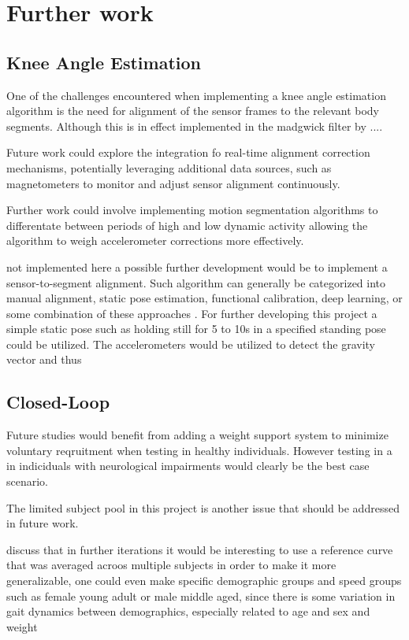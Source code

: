 
\section{Further work}


\subsection{Knee Angle Estimation}
One of the challenges encountered when implementing a knee angle estimation algorithm is the need for alignment of the sensor frames to the relevant body segments. Although this is in effect implemented in the madgwick filter by .... 


Future work could explore the integration fo real-time alignment correction mechanisms, potentially leveraging additional data sources, such as magnetometers to monitor and adjust sensor alignment continuously.

Further work could involve implementing motion segmentation algorithms to differentate between periods of high and low dynamic activity allowing the algorithm to weigh accelerometer corrections more effectively.

not implemented here a possible further development would be to implement a sensor-to-segment alignment. Such algorithm can generally be categorized into manual alignment, static pose estimation, functional calibration, deep learning, or some combination of these approaches \cite{rhudy_knee_2024}. For further developing this project a simple static pose such as holding still for 5 to 10s in a specified standing pose could be utilized. The accelerometers would be utilized to detect the gravity vector and thus 


\subsection{Closed-Loop}
Future studies would benefit from adding a weight support system to minimize voluntary reqruitment when testing in healthy individuals. However testing in a in indiciduals with neurological impairments would clearly be the best case scenario. 

The limited subject pool in this project is another issue that should be addressed in future work.

discuss that in further iterations it would be interesting to use a reference curve that was averaged acroos multiple subjects in order to make it more generalizable, one could even make specific demographic groups and speed groups such as female young adult or male middle aged, since there is some variation in gait dynamics between demographics, especially related to age and sex and weight

